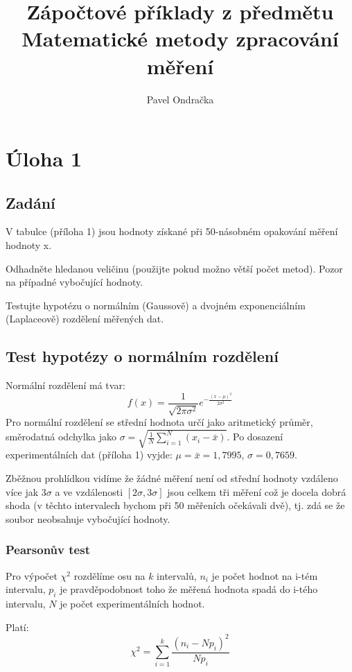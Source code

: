 \documentclass[12pt]{article}
\begin{document}
\title{Zápočtové příklady z předmětu Matematické metody zpracování měření}
\author{Pavel Ondračka}
\maketitle

\section{Úloha 1}
\subsection{Zadání}
V tabulce (příloha 1) jsou hodnoty získané při 50-násobném opakování měření hodnoty x.

Odhadněte hledanou veličinu (použijte pokud možno větší počet metod). Pozor na případné vybočující hodnoty.

Testujte hypotézu o normálním (Gaussově) a dvojném exponenciálním (Laplaceově) rozdělení měřených dat.

\subsection{Test hypotézy o normálním rozdělení}
Normální rozdělení má tvar:
\begin{equation} f(x) = \frac{1}{\sqrt{2 \pi \sigma^2}} e^{-\frac{(x - \mu)^2}{2 \sigma^2}} \end{equation}
Pro normální rozdělení se střední hodnota určí jako aritmetický průměr, směrodatná odchylka jako $\sigma = \sqrt{\frac{1}{N}\sum_{i=1}^N(x_i - \bar{x})}$. 
Po dosazení experimentálních dat (příloha 1) vyjde: $\mu = \bar{x} = 1,7995$, $\sigma = 0,7659$.

Zběžnou prohlídkou vidíme že žádné měření není od střední hodnoty vzdáleno více jak $3\sigma$ a ve vzdálenosti $[2\sigma, 3\sigma]$ jsou celkem tři měření což je docela dobrá shoda (v těchto intervalech bychom při 50 měřeních očekávali dvě), tj. zdá se že soubor neobsahuje vybočující hodnoty.

\subsubsection{Pearsonův test}
Pro výpočet $\chi^2$ rozdělíme osu na $k$ intervalů, $n_i$ je počet hodnot na i-tém intervalu, $p_i$ je pravděpodobnost toho že měřená hodnota spadá do i-tého intervalu, $N$ je počet experimentálních hodnot. 

Platí:
\begin{equation}\chi^2 = \sum_{i=1}^k \frac{(n_i - Np_i)^2}{Np_i}\end{equation}
\end{document}
